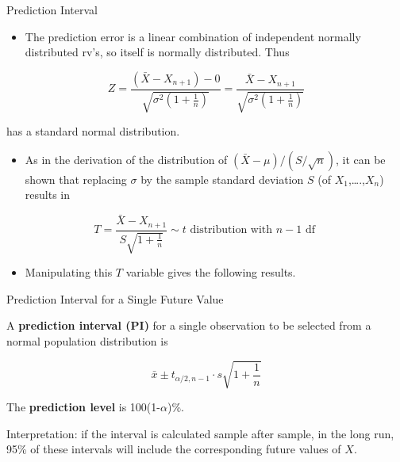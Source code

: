 \documentclass[
  ignorenonframetext,
]{beamer}
\providecommand{\tightlist}{%
  \setlength{\itemsep}{0pt}\setlength{\parskip}{0pt}}\usepackage{longtable,booktabs,array}
\begin{document}
\begin{frame}{Prediction Interval}
\protect\hypertarget{prediction-interval}{}
\begin{itemize}[<+->]
\tightlist
\item
  The prediction error is a linear combination of independent normally
  distributed rv's, so itself is normally distributed. Thus
\end{itemize}

\[
Z = \frac{(\bar{X} - X_{n+1}) - 0}{\sqrt{\sigma^{2}\left(1 + \frac{1}{n}\right)}} = \frac{\bar{X} - X_{n+1}}{\sqrt{\sigma^{2}\left(1 + \frac{1}{n}\right)}}
\]

has a standard normal distribution.

\begin{itemize}[<+->]
\tightlist
\item
  As in the derivation of the distribution of
  \((\bar{X} - \mu)/(S/\sqrt{n})\), it can be shown that replacing
  \(\sigma\) by the sample standard deviation \(S\) (of
  \(X_{1}\),\ldots.,\(X_{n}\)) results in
\end{itemize}

\[
T = \frac{\bar{X} - X_{n+1}}{S\sqrt{1 + \frac{1}{n}}} \sim t \text{ distribution with } n - 1 \text{ df }
\]

\begin{itemize}[<+->]
\tightlist
\item
  Manipulating this \(T\) variable gives the following results.
\end{itemize}
\end{frame}

\begin{frame}{Prediction Interval for a Single Future Value}
\protect\hypertarget{prediction-interval-for-a-single-future-value}{}
\begin{tcolorbox}[enhanced jigsaw, titlerule=0mm, colbacktitle=quarto-callout-important-color!10!white, opacityback=0, bottomrule=.15mm, colback=white, colframe=quarto-callout-important-color-frame, arc=.35mm, title=\textcolor{quarto-callout-important-color}{\faExclamation}\hspace{0.5em}{Proposition}, toprule=.15mm, breakable, coltitle=black, leftrule=.75mm, bottomtitle=1mm, left=2mm, rightrule=.15mm, toptitle=1mm, opacitybacktitle=0.6]

A \textbf{prediction interval (PI)} for a single observation to be
selected from a normal population distribution is

\[
\bar{x} \pm t_{\alpha/2,n-1}\cdot s\sqrt{1 + \frac{1}{n}}
\]

The \textbf{prediction level} is 100(1-\(\alpha\))\%.

\end{tcolorbox}

Interpretation: if the interval is calculated sample after sample, in
the long run, 95\% of these intervals will include the corresponding
future values of \(X\).
\end{frame}
\end{document}
